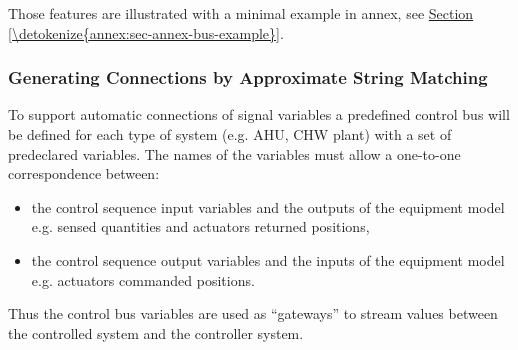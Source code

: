 \documentclass[letterpaper,10pt, openany,english]{sphinxmanual}
\begin{document}
Those features are illustrated with a minimal example in annex, see \hyperref[\detokenize{annex:sec-annex-bus-example}]{Section \ref{\detokenize{annex:sec-annex-bus-example}}}.


\subsubsection{Generating Connections by Approximate String Matching}
\label{\detokenize{requirements:generating-connections-by-approximate-string-matching}}
To support automatic connections of signal variables a predefined control bus will be defined for each type of system (e.g. AHU, CHW plant) with a set of predeclared variables. The names of the variables must allow a one-to-one correspondence between:
\begin{itemize}
\item {} 
the control sequence input variables and the outputs of the equipment model e.g. sensed quantities and actuators returned positions,

\item {} 
the control sequence output variables and the inputs of the equipment model e.g. actuators commanded positions.

\end{itemize}

Thus the control bus variables are used as “gateways” to stream values between the controlled system and the controller system.
\end{document}
